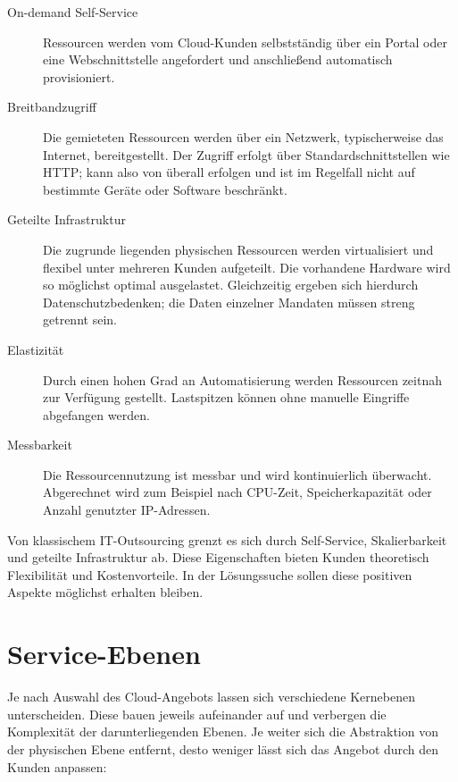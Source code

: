 \begin{description}
	
	\item[On-demand Self-Service] Ressourcen werden vom Cloud-Kunden selbstständig über ein Portal oder eine Webschnittstelle angefordert und anschließend automatisch provisioniert.
	
	\item[Breitbandzugriff] Die gemieteten Ressourcen werden über ein Netzwerk, typischerweise das Internet, bereitgestellt. Der Zugriff erfolgt über Standardschnittstellen wie HTTP; kann also von überall erfolgen und ist im Regelfall nicht auf bestimmte Geräte oder Software beschränkt.
	
	\item[Geteilte Infrastruktur] Die zugrunde liegenden physischen Ressourcen werden virtualisiert und flexibel unter mehreren Kunden aufgeteilt. Die vorhandene Hardware wird so möglichst optimal ausgelastet. Gleichzeitig ergeben sich hierdurch Datenschutzbedenken; die Daten einzelner Mandaten müssen streng getrennt sein.
	
	\item[Elastizität] Durch einen hohen Grad an Automatisierung werden Ressourcen zeitnah zur Verfügung gestellt. Lastspitzen können ohne manuelle Eingriffe abgefangen werden.
	
	\item[Messbarkeit] Die Ressourcennutzung ist messbar und wird kontinuierlich überwacht. Abgerechnet wird zum Beispiel nach CPU-Zeit, Speicherkapazität oder Anzahl genutzter IP-Adressen.
	
\end{description}

Von klassischem IT-Outsourcing grenzt es sich durch Self-Service, Skalierbarkeit und geteilte Infrastruktur ab. Diese Eigenschaften bieten Kunden theoretisch Flexibilität und Kostenvorteile. In der Lösungssuche sollen diese positiven Aspekte möglichst erhalten bleiben.


\section{Service-Ebenen}

Je nach Auswahl des Cloud-Angebots lassen sich verschiedene Kernebenen unterscheiden. Diese bauen jeweils aufeinander auf und verbergen die Komplexität der darunterliegenden Ebenen. Je weiter sich die Abstraktion von der physischen Ebene entfernt, desto weniger lässt sich das Angebot durch den Kunden anpassen:

